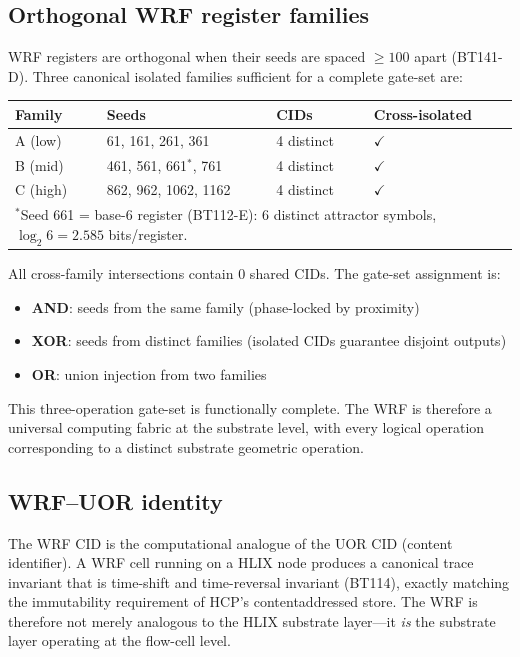\subsection{Orthogonal WRF register families}

WRF registers are orthogonal when their seeds are spaced $\ge 100$ apart (BT141-D).
Three canonical isolated families sufficient for a complete gate-set are:

\begin{center}
\renewcommand{\arraystretch}{1.18}
\begin{tabular}{llll}
\toprule
\textbf{Family} & \textbf{Seeds} & \textbf{CIDs} & \textbf{Cross-isolated} \\
\midrule
A (low) & 61, 161, 261, 361 & 4 distinct & $\checkmark$ \\
B (mid) & 461, 561, 661$^*$, 761 & 4 distinct & $\checkmark$ \\
C (high) & 862, 962, 1062, 1162 & 4 distinct & $\checkmark$ \\
\bottomrule
\multicolumn{4}{l}{\small $^*$Seed 661 = base-6 register (BT112-E): $6$ distinct attractor symbols,
$\log_2 6 = 2.585$ bits/register.}
\end{tabular}
\end{center}

All cross-family intersections contain $0$ shared CIDs. The gate-set assignment is:
\begin{itemize}[leftmargin=2em,nosep]
\item \textbf{AND}: seeds from the same family (phase-locked by proximity)
\item \textbf{XOR}: seeds from distinct families (isolated CIDs guarantee disjoint outputs)
\item \textbf{OR}: union injection from two families
\end{itemize}
This three-operation gate-set is functionally complete. The WRF is therefore a universal
computing fabric at the substrate level, with every logical operation corresponding to a
distinct substrate geometric operation.

\subsection{WRF--UOR identity}
The WRF CID is the computational analogue of the UOR CID (content identifier). A WRF cell
running on a HLIX node produces a canonical trace invariant that is time-shift and
time-reversal invariant (BT114), exactly matching the immutability requirement of HCP's
contentaddressed store. The WRF is therefore not merely analogous to the HLIX substrate
layer---it \emph{is} the substrate layer operating at the flow-cell level.

